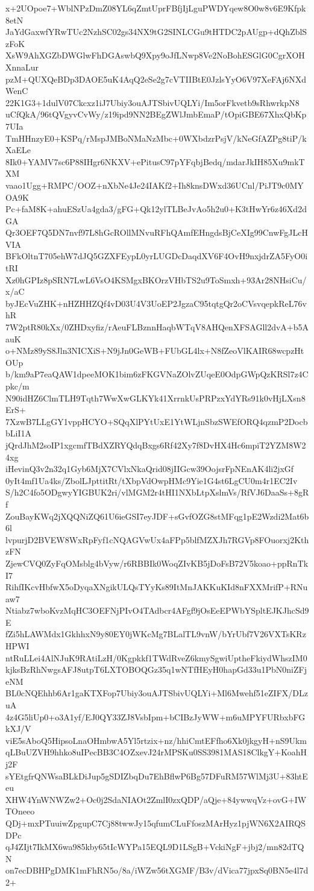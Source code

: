 x+2UOpoe7+WblNPzDmZ08YL6qZmtUprFBfjIjLguPWDYqew8O0w8v6E9Kfpk8etN
JaYdGaxwfYRwTUc2NzhSC02gs34NX9tG2SINLCGu9tHTDC2pAUgp+dQhZblSzFoK
XsW9AhXGZbDWGlwFhDGAswbQ9Xpy9oJfLNwp8Ve2NoBohESGlG0CgrXOHXnnaLur
pzM+QUXQeBDp3DAOE5uK4AqQ2eSe2g7cVTIIBtE0JzlsYyO6V97XeFAj6NXdWenC
22K1G3+1dulV07Ckcxz1iJ7Ubiy3ouAJTSbivUQLYi/Im5orFkvetb9sRhwrkpN8
uCfQkA/96tQVgyvCvWy/z19ipd9NN2BEgZWlJmbEmaP/tOpiGBE67XhxQbKp7UIa
TmHHnzyE0+KSPq/rMspJMBoNMaNzMbc+0WXbdzrPsjV/kNeGfAZPg8tiP/kXaELe
8Ik0+YAMV7sc6P88IHgr6NKXV+ePitusC97pYFqbjBedq/mdarJkIH85Xu9mkTXM
vaao1Ugg+RMPC/OOZ+nXbNe4Je24IAKf2+Ih8knsDWxd36UCnl/PiJT9c0MYOA9K
Pc+faM8K+ahuESzUa4gda3/gFG+Qk12ylTLBeJvAo5h2u0+K3tHwYr6z46Xd2dGA
Qr3OEF7Q5DN7nvf97L8hGcROllMNvuRFhQAmfEHngdsBjCeXIg99CnwFgJLcHVIA
BFkOltnT705ehW7dJQ5GZXFEypL0yrLUGDcDaqdXV6F4OvH9nxjdrZA5FyO0itRI
Xz0hGPIz8pSRN7LwL6VsO4KSMgxBKOrzVHbTS2u9ToSmxh+93Ar28NHsiCu/x/aC
byJEcVuZHK+nHZHHZQf4vD03U4V3UoEP2JgzaC95tqtgQr2oCVsvqepkReL76vhR
7W2ptR80kXx/0ZHDxyfiz/rAeuFLBznnHaqbWTqV8AHQenXFSAGll2dvA+b5AauK
o+NMz89yS8Jln3NICXiS+N9jJn0GeWB+FUbGL4lx+N8fZeoVlKAIR68wcpzHtOUp
b/km9aP7eaQAW1dpeeMOK1bim6zFKGVNaZOlvZUqeE0OdpGWpQzKRSl7z4Cpkc/m
N90idHZ6ClmTLH9Tqth7WwXwGLKYk41XrrnkUsPRPzxYdYRs91k0vHjLXsn8ErS+
7XzwB7LLgGY1vppHCYO+SQqXlPYtUxE1YtWLjnSbzSWEfORQ4qzmP2DocbbLiI1A
jQrdJhM2soIP1xgcmfTBdXZRYQdqBxgs6Rf42Xy7f8DvHX4Hc6mpiT2YZM8W24xg
iHevinQ3v2n32q1Gyb6MjX7CVlxNkaQrid08jIIGcw39OojsrFpNEnAK4li2jxGf
0yIt4mf1Ua4ks/ZbolLJpttitRt/tXbpVdOwpHMc9Yie1G4st6LgCU0m4r1EC2Iv
S/h2C4fo5ODgwyYIGBUK2ri/vlMGM2r4tHI1NXbLtpXslmVs/RfVJ6DaaSs+8gRf
ZouBayKWq2jXQQNiZQ61U6ieGSI7eyJDF+sGvfOZG8stMFqg1pE2Wzdi2Mat6b6l
lvpurjD2BVEW8WxRpFyf1cNQAGVwUx4aFPp5blfMZXJh7RGVp8FOuorxj2KthzFN
ZjewCVQ0ZyFqOMsblg4bVyw/r6RBBIk0WoqZIvKB5jDoFsB72V5koao+ppRnTkI7
RihfIKcvHbfwX5oDyqaXNgikULQsTYyKs89ItMnJAKKuKId8nFXXMrifP+RNuaw7
Ntiabz7wboKvzMqHC3OEFNjPIvO4TAdbcr4AFgf9jOsEeEPWbYSpltEJKJhcSd9E
fZi5hLAWMdx1GkhhxN9y80EY0jWKcMg7BLalTL9vnW/bYrUbf7V26VXTsKRzHPWI
ntRuLLei4AlNJuK9RAtiLzH/0Kgpkkf1TWdRveZ6kmySgwiUptheFkiydWhszIM0
kjksBzRhNwgsAFJ8utpT6LXTOBOQGz35q1wNTfHEyH0hapGd33u1PbN0niZFjeNM
BL0cNQEhhb6Ar1gaKTXFop7Ubiy3ouAJTSbivUQLYi+Ml6Mwehf51eZIFX/DLzuA
4z4G5liUp0+o3A1yf/EJ0QY33ZJ8VsbIpm+bCIBzJyWW+m6uMPYFURbxbFGkXJ/V
viE5sAboQ5HipsoLnaOHmbwA5Yl5rtzix+nz/hhiCmtEFfho6Xk0jkgyH+nS9Ukm
qLBuUZVH9hhko8uIPecBB3C4OZxevJ24rMPSKu0SS3981MAS18ClkgY+KoahHj2F
sYEtgfrQNWsaBLkDiJup5gSDIZbqDu7EhBflwP6Bg57DFuRM57WlMj3U+83htEeu
XHW4YnWNWZw2+Oc0j2SdaNIAOt2ZmlI0zxQDP/aQje+84ywwqVz+ovG+IWTOneeo
QDj+mxPTuuiwZpgupC7Cj88twwJy15qfumCLuFfoszMArHyz1pjWN6X2AIRQSDPc
qJ4ZIjt7IkMX6wa985kby65tIcWYPa15EQL9D1LSgB+VckiNgF+jbj2/mn82dTQN
on7ecDBHPgDMK1mFhRN5o/8a/iWZw56tXGMF/B3v/dVica77jpxSq0BN5e4l7d2+

